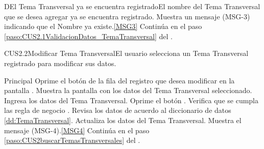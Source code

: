 		\begin{UCtrayectoriaA}{D}{El Tema Transversal ya se encuentra registrado}{El nombre del Tema Transversal que se desea agregar ya se encuentra registrado.}
			\UCpaso Muestra un mensaje (MSG-3) indicando que el Nombre ya existe.\ref{MSG3}
			\UCpaso Continúa en el paso \ref{paso:CUS2.1ValidacionDatos_TemaTransversal} del .
		\end{UCtrayectoriaA}


	\begin{UseCase}{CUS2.2}{Modificar Tema Transversal}{El usuario selecciona un Tema Transversal registrado para modificar sus datos.}
	\end{UseCase}

	\begin{UCtrayectoria}{Principal}			
			\UCpaso[\UCactor] Oprime el botón  de la fila del registro que desea modificar en la pantalla .	
			\UCpaso Muestra la pantalla  con los datos del Tema Transversal seleccionado.
                        \UCpaso [\UCactor] Ingresa los datos del Tema Transversal.\label{paso:CUS2.2ingresaDatosTemaTransversal}
			\UCpaso [\UCactor] Oprime el botón .
			\UCpaso Verifica que se cumpla las regla de negocio .  
			\UCpaso Revisa los datos de acuerdo al diccionario de datos \ref{dd:TemaTransversal}. 
			\UCpaso Actualiza los datos del Tema Transversal.
			\UCpaso Muestra el mensaje (MSG-4).\ref{MSG4}
			\UCpaso Continúa en el paso \ref{paso:CUS2buscarTemasTransversales} del .
	\end{UCtrayectoria}

